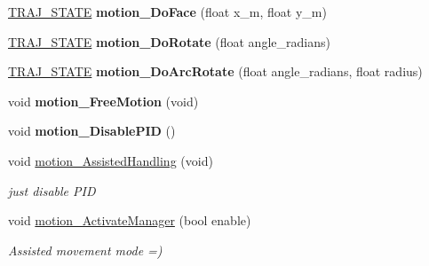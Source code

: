 \begin{DoxyCompactItemize}
\hyperlink{path__manager_8h_adb3360abeb29758da93865c8afcb80eb}{T\+R\+A\+J\+\_\+\+S\+T\+A\+TE} {\bfseries motion\+\_\+\+Do\+Face} (float x\+\_\+m, float y\+\_\+m)
\item 
\mbox{\label{classAsservDriver__mbed__i2c_a31be52ac0bbe9f9d761548deb1c86252}} 
\hyperlink{path__manager_8h_adb3360abeb29758da93865c8afcb80eb}{T\+R\+A\+J\+\_\+\+S\+T\+A\+TE} {\bfseries motion\+\_\+\+Do\+Rotate} (float angle\+\_\+radians)
\item 
\mbox{\label{classAsservDriver__mbed__i2c_a4be26a85247a892da1d4fe2b73d1798e}} 
\hyperlink{path__manager_8h_adb3360abeb29758da93865c8afcb80eb}{T\+R\+A\+J\+\_\+\+S\+T\+A\+TE} {\bfseries motion\+\_\+\+Do\+Arc\+Rotate} (float angle\+\_\+radians, float radius)
\item 
\mbox{\label{classAsservDriver__mbed__i2c_a35d019875b35e49db97a3e700404e53a}} 
void {\bfseries motion\+\_\+\+Free\+Motion} (void)
\item 
\mbox{\label{classAsservDriver__mbed__i2c_a24eba7a1a351ef4ba2fb41af163feb8c}} 
void {\bfseries motion\+\_\+\+Disable\+P\+ID} ()
\item 
\mbox{\label{classAsservDriver__mbed__i2c_a5b4597c615883c58bbc0c5d649c8a67f}} 
void \hyperlink{classAsservDriver__mbed__i2c_a5b4597c615883c58bbc0c5d649c8a67f}{motion\+\_\+\+Assisted\+Handling} (void)
\begin{DoxyCompactList}\small\item\em just disable P\+ID \end{DoxyCompactList}\item 
\mbox{\label{classAsservDriver__mbed__i2c_a58c64e63be1bbf59fb1a6ab18db1c15e}} 
void \hyperlink{classAsservDriver__mbed__i2c_a58c64e63be1bbf59fb1a6ab18db1c15e}{motion\+\_\+\+Activate\+Manager} (bool enable)
\begin{DoxyCompactList}\small\item\em Assisted movement mode =) \end{DoxyCompactList}\item 
\mbox{\label{classAsservDriver__mbed__i2c_ac160c31f1579eca298e3891b51e0727b}} 

\end{DoxyCompactItemize}
